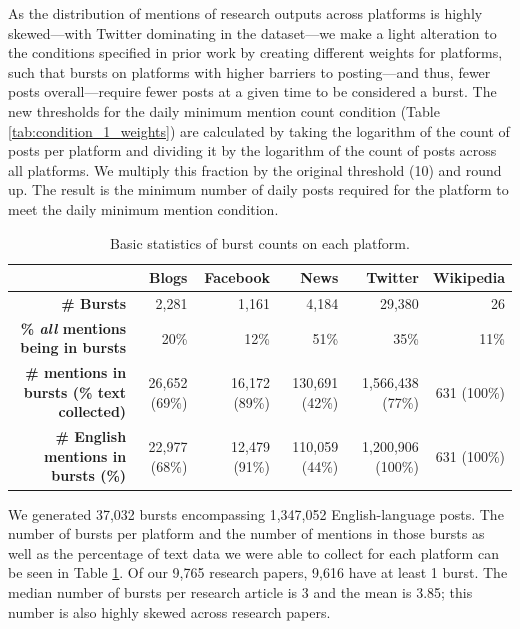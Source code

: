\documentclass[letterpaper]{article} %
\begin{document}
As the distribution of mentions of research outputs across platforms is highly skewed---with Twitter dominating in the dataset---we make a light alteration to the conditions specified in prior work \citep{chengCascadesRecur2016} by creating different weights for platforms, such that bursts on platforms with higher barriers to posting---and thus, fewer posts overall---require fewer posts at a given time to be considered a burst. %
The new thresholds for the daily minimum mention count condition (Table \ref{tab:condition_1_weights}) are calculated by taking the logarithm of the count of posts per platform and dividing it by the logarithm of the count of posts across all platforms. We multiply this fraction by the original threshold (10) and round up. The result is the minimum number of daily posts required for the platform to meet the daily minimum mention condition.


\begin{table}[t]
\centering
\begin{tabular}{@{}r|r r r r r @{}}
& \textbf{Blogs} & \textbf{Facebook} & \textbf{News} & \textbf{Twitter} & \textbf{Wikipedia} \\
\hline
\textbf{\# Bursts} & 2,281 & 1,161 & 4,184 & 29,380 & 26 \\
\textbf{\% \textit{all} mentions being in bursts} & 20\% & 12\% & 51\% & 35\% & 11\% \\
\textbf{\# mentions in bursts (\% text collected)} & 26,652 (69\%) & 16,172 (89\%) & 130,691 (42\%) & 1,566,438 (77\%) & 631 (100\%) \\
\textbf{\# English mentions in bursts (\%)} & 22,977 (68\%) & 12,479 (91\%) & 110,059 (44\%) & 1,200,906 (100\%) & 631 (100\%)\\
\end{tabular}
\caption{Basic statistics of burst counts on each platform.}
\label{tab:burst_post_counts}
\end{table}


We generated 37,032 bursts encompassing 1,347,052 English-language posts. The number of bursts per platform and the number of mentions in those bursts as well as the percentage of text data we were able to collect for each platform can be seen in Table \ref{tab:burst_post_counts}.
Of our 9,765 research papers, 9,616 have at least 1 burst. The median number of bursts per research article is 3 and the mean is 3.85; this number is also highly skewed across research papers.%
\end{document}
